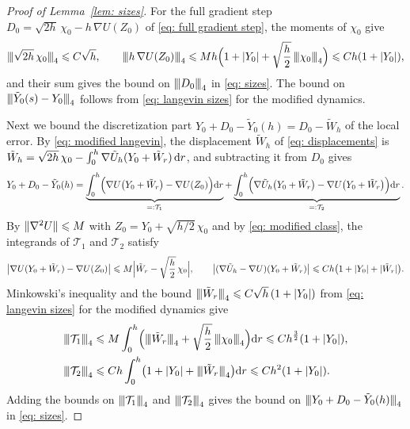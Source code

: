 \begin{proof}[Proof of Lemma~\ref{lem: sizes}]
    For the full gradient step $D_0 = \sqrt{2h}\, \chi_0 - h\, \nabla U(Z_0)$ of \eqref{eq: full gradient step}, the moments of $\chi_0$ give
    \begin{equation*}
        {\vert\kern-0.25ex\vert\kern-0.25ex\vert} \sqrt{2h}\, \chi_0 {\vert\kern-0.25ex\vert\kern-0.25ex\vert}_4 \leqslant C\sqrt h , \qquad {\vert\kern-0.25ex\vert\kern-0.25ex\vert} h\, \nabla U(Z_0) {\vert\kern-0.25ex\vert\kern-0.25ex\vert}_4 \leqslant M h \Bigl( 1 + |Y_0| + \sqrt{\frac h2}\, {\vert\kern-0.25ex\vert\kern-0.25ex\vert} \chi_0 {\vert\kern-0.25ex\vert\kern-0.25ex\vert}_4 \Bigr) \leqslant C h (1+|Y_0|) ,
    \end{equation*}
    and their sum gives the bound on ${\vert\kern-0.25ex\vert\kern-0.25ex\vert} D_0 {\vert\kern-0.25ex\vert\kern-0.25ex\vert}_4$ in \eqref{eq: sizes}. The bound on ${\vert\kern-0.25ex\vert\kern-0.25ex\vert} \tilde Y_0(s) - Y_0 {\vert\kern-0.25ex\vert\kern-0.25ex\vert}_4$ follows from \eqref{eq: langevin sizes} for the modified dynamics.

    Next we bound the discretization part $Y_0 + D_0 - \tilde Y_0(h) = D_0 - \tilde W_h$ of the local error. By \eqref{eq: modified langevin}, the displacement $\tilde W_h$ of \eqref{eq: displacements} is $\tilde W_h = \sqrt{2h}\, \chi_0 - \int_0^h \nabla \tilde U_h(Y_0 + \tilde W_r)\,\mathrm{d} r$, and subtracting it from $D_0$ gives
    \begin{equation}
        Y_0 + D_0 - \tilde Y_0(h) = \underbrace{\int_0^h \Bigl( \nabla U\bigl( Y_0 + \tilde W_r \bigr) - \nabla U( Z_0 ) \Bigr) \mathrm{d} r}_{=: \mathcal T_1} + \underbrace{\int_0^h \Bigl( \nabla \tilde U_h\bigl( Y_0 + \tilde W_r \bigr) - \nabla U\bigl( Y_0 + \tilde W_r \bigr) \Bigr) \mathrm{d} r}_{=: \mathcal T_2} .
        \label{eq: local error explicit}
    \end{equation}
    By $\lVert \nabla^2 U \rVert \leqslant M$ with $Z_0 = Y_0 + \sqrt{h/2}\, \chi_0$ and by \eqref{eq: modified class}, the integrands of $\mathcal T_1$ and $\mathcal T_2$ satisfy
    \begin{equation*}
        \bigl| \nabla U( Y_0 + \tilde W_r ) - \nabla U( Z_0 ) \bigr| \leqslant M \Bigl| \tilde W_r - \sqrt{\frac h2}\, \chi_0 \Bigr| , \qquad
        \bigl| ( \nabla \tilde U_h - \nabla U )( Y_0 + \tilde W_r ) \bigr| \leqslant C h \bigl( 1 + |Y_0| + |\tilde W_r| \bigr) .
    \end{equation*}
    Minkowski's inequality and the bound ${\vert\kern-0.25ex\vert\kern-0.25ex\vert} \tilde W_r {\vert\kern-0.25ex\vert\kern-0.25ex\vert}_4 \leqslant C \sqrt h\, (1 + |Y_0|)$ from \eqref{eq: langevin sizes} for the modified dynamics give
    \begin{equation*}
    \begin{aligned}
        \pnorm{\mathcal T_1}_4 & \Le M \int_0^h \Bigl( \pnorm{\tilde W_r}_4 + \sqrt{\frac h2}\, \pnorm{\chi_0}_4 \Bigr) \D r \Le C h^{\frac32} (1+|Y_0|) , \\
        \pnorm{\mathcal T_2}_4 & \Le C h \int_0^h \bigl( 1 + |Y_0| + \pnorm{\tilde W_r}_4 \bigr) \D r \Le C h^2 (1+|Y_0|) .
    \end{aligned}
    \end{equation*}
    Adding the bounds on ${\vert\kern-0.25ex\vert\kern-0.25ex\vert} \mathcal T_1 {\vert\kern-0.25ex\vert\kern-0.25ex\vert}_4$ and ${\vert\kern-0.25ex\vert\kern-0.25ex\vert} \mathcal T_2 {\vert\kern-0.25ex\vert\kern-0.25ex\vert}_4$ gives the bound on ${\vert\kern-0.25ex\vert\kern-0.25ex\vert} Y_0 + D_0 - \tilde Y_0(h) {\vert\kern-0.25ex\vert\kern-0.25ex\vert}_4$ in \eqref{eq: sizes}.


\end{proof}
